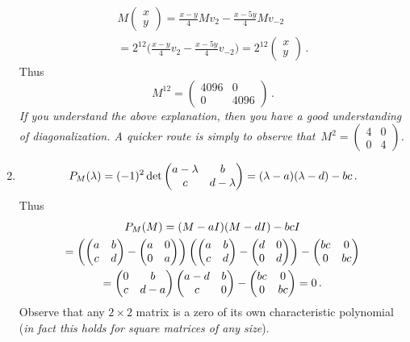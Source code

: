 \begin{enumerate}
\begin{gather*}
M \begin{pmatrix} x \\ y \end{pmatrix} = \frac{x-y}{4} M v_2  -\frac{x-5y}4 M v_{-2}\\ = 2^{12} \Big(\frac{x-y}{4}  v_2 -\frac{x-5y}4  v_{-2}\Big) 
= 2^{12} \begin{pmatrix} x \\ y \end{pmatrix}\, .
\end{gather*}
Thus \[M^{12}=\begin{pmatrix} 4096 & 0 \\ 0 & 4096\end{pmatrix}\, .\]
{\itshape If you understand the above explanation, then you have a good understanding of diagonalization.  A quicker route  
is simply to observe that~$M^2 = \begin{pmatrix}4 & 0 \\ 0 & 4\end{pmatrix} $.}

\item 
\[
P_M(\lambda) = (-1)^2 \det\begin{pmatrix} a-\lambda & \mc b  \\ \mc c &d-\lambda\end{pmatrix}
=(\lambda-a)(\lambda-d) - bc\, . 
\]
Thus
\begin{gather*}
P_M(M)=(M-a I )(M- d I) - bc I \\= 
\left(\begin{pmatrix}a&b\\c&d\end{pmatrix}-\begin{pmatrix}a&0\\0&a\end{pmatrix}\right)
\left(\begin{pmatrix}a&b\\c&d\end{pmatrix}-\begin{pmatrix}d&0\\0&d\end{pmatrix}\right)-\begin{pmatrix}bc&0\\0&bc\end{pmatrix}
\\
=\begin{pmatrix}0&\mc b\\c&d-a\end{pmatrix}\begin{pmatrix}a-d&b\\\mc c&0\end{pmatrix}-\begin{pmatrix}bc&0\\0&bc\end{pmatrix}=0\, .
\end{gather*}
Observe that any $2\times 2$ matrix is a zero of its own characteristic polynomial ({\itshape in fact this holds for square matrices of any size}).


\end{enumerate}
